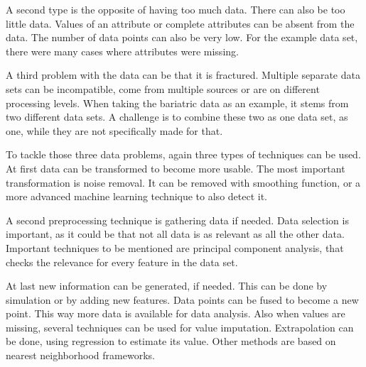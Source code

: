 \documentclass[10pt,a4paper]{article}
\begin{document}
 	A second type is the opposite of having too much data. There can also be too little data. Values of an attribute or complete attributes can be absent from the data. The number of data points can also be very low. For the example data set, there were many cases where attributes were missing.
 	
	A third problem with the data can be that it is fractured. Multiple separate data sets can be incompatible, come from multiple sources or are on different processing levels. When taking the bariatric data as an example, it stems from two different data sets. A challenge is to combine these two as one data set, as one, while they are not specifically made for that.
 	
	To tackle those three data problems, again three types of techniques can be used. At first data can be transformed to become more usable. The most important transformation is noise removal. It can be removed with smoothing function\cite{somorjai2004data, karagiannis2011noise}, or a more advanced machine learning technique to also detect it.\cite{gamberger2000noise}
 	
 	A second preprocessing technique is gathering data if needed. Data selection is important, as it could be that not all data is as relevant as all the other data. Important techniques to be mentioned are principal component analysis, that checks the relevance for every feature in the data set.\cite{duszak1994using} 
 	
 	At last new information can be generated, if needed. This can be done by simulation or by adding new features. Data points can be fused to become a new point. This way more data is available for data analysis. Also when values are missing, several techniques can be used for value imputation. Extrapolation can be done, using regression to estimate its value. Other methods are based on nearest neighborhood frameworks.\cite{zhu2011missing} 
 	
\end{document}
